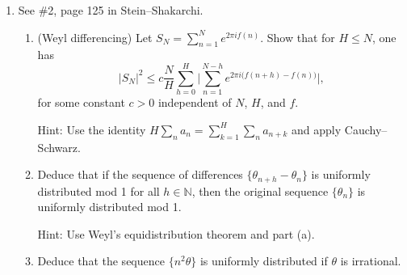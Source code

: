 \documentclass[a4paper]{article}
\newcommand{\R}{\mathbb{R}}
\begin{document}
\begin{enumerate}
\begin{proof}
  Therefore, $\widehat{f} \overline{ \widehat{g} } (-h) = 0$ for all $h$. Because $\widehat{f} \neq 0$ almost everywhere, $\widehat{g} = 0$ almost
  everywhere. Therefore, $g=0$ almost everywhere, and $ \{f_h\}_{h \in \R}$ spans $L^2$.

\end{proof}

\item See \#2, page 125 in Stein--Shakarchi.


\begin{enumerate}

\item (Weyl differencing) Let $S_N = \sum_{n=1}^N e^{2\pi i f(n)}$. Show that for $H\le N$, one has  $$ |S_N|^2 \le c \frac{N}{H}  \sum_{h=0}^H \bigg| \sum_{n=1}^{N-h} e^{2\pi i \big( f(n+h)  - f (n) \big)}  \bigg|,  $$ for some constant $c>0$  independent of $N$, $H$, and $f$.

Hint: Use the identity $H \sum_n a_n = \sum_{k=1}^H \sum_n a_{n+k}$ and apply Cauchy--Schwarz.

\item Deduce that if the  sequence of differences $\{ \theta_{n+h} - \theta_n \} $ is uniformly distributed mod 1 for all $h \in \mathbb N$, then the original sequence $\{ \theta_n \}$ is uniformly distributed mod 1.

Hint: Use Weyl's equidistribution theorem and part (a).

\item Deduce that the sequence $\{ n^2 \theta \}$ is uniformly distributed  if $\theta$ is irrational.


\end{enumerate}

\end{enumerate}
\end{document}
